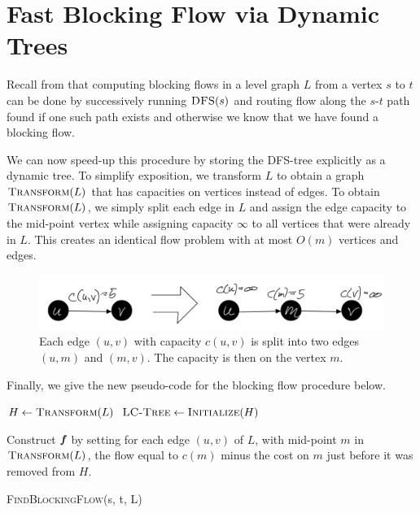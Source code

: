 \section{Fast Blocking Flow via Dynamic Trees}

Recall from  that computing blocking flows in a level graph $L$ from a vertex $s$ to $t$ can be done by successively running $\textsc{DFS}(s)$ and routing flow along the $s$-$t$ path found if one such path exists and otherwise we know that we have found a blocking flow. 

We can now speed-up this procedure by storing the DFS-tree explicitly as a dynamic tree. To simplify exposition, we transform $L$ to obtain a graph $\textsc{Transform}(L)$ that has capacities on vertices instead of edges. To obtain $\textsc{Transform}(L)$, we simply split each edge in $L$ and assign the edge capacity to the mid-point vertex while assigning capacity $\infty$ to all vertices that were already in $L$. This creates an identical flow problem with at most $O(m)$ vertices and edges.

\begin{figure}[!ht]
    \centering
    \includegraphics[scale=0.2]{./fig/TransformToVertCaps_lectureDynamicTree.jpeg}
    \caption{Each edge $(u,v)$ with capacity $c(u,v)$ is split into two edges $(u,m)$ and $(m,v)$. The capacity is then on the vertex $m$.}
    \label{fig:my_label}
\end{figure}

Finally, we give the new pseudo-code for the blocking flow procedure below.

\begin{algorithm}[H]
  \SetAlgoLined
  $H \leftarrow \textsc{Transform}(L)$\;
  $\textsc{LC-Tree} \gets \textsc{Initialize}(H)$\;
  
  Construct $\boldsymbol{\mathit{f}}$ by setting for each edge $(u,v)$ of $L$, with mid-point $m$ in $\textsc{Transform}(L)$, the flow equal to $c(m)$ minus the cost on $m$ just before it was removed from $H$.
  \caption{\textsc{FindBlockingFlow}(s, t, L)}
\end{algorithm}

